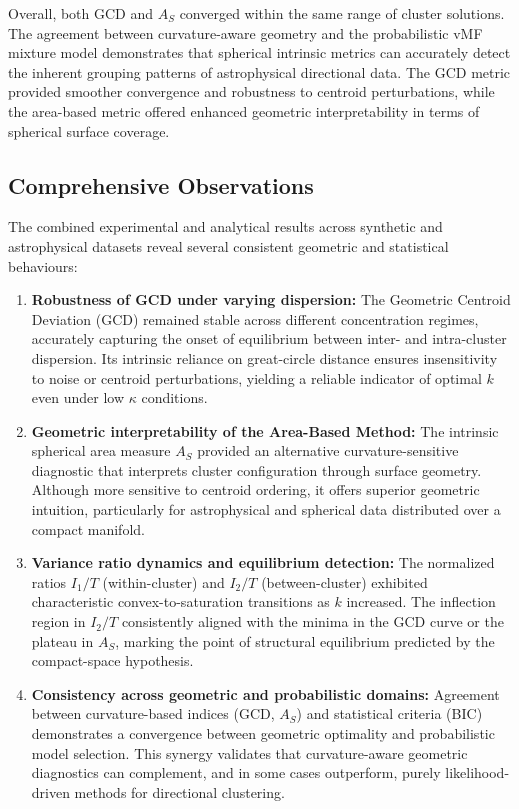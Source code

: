 \documentclass[12pt,a4paper]{report}
\begin{document}
\vspace{0.2cm}
\noindent Overall, both GCD and $A_S$ converged within the same range of cluster solutions.  
The agreement between curvature-aware geometry and the probabilistic vMF mixture model 
demonstrates that spherical intrinsic metrics can accurately detect the inherent grouping 
patterns of astrophysical directional data. The GCD metric provided smoother convergence 
and robustness to centroid perturbations, while the area-based metric offered enhanced 
geometric interpretability in terms of spherical surface coverage.


\subsection{Comprehensive Observations}
The combined experimental and analytical results across synthetic and astrophysical datasets reveal several consistent geometric and statistical behaviours:

\begin{enumerate}
    \item \textbf{Robustness of GCD under varying dispersion:}  
    The Geometric Centroid Deviation (GCD) remained stable across different concentration regimes, accurately capturing the onset of equilibrium between inter- and intra-cluster dispersion.  
    Its intrinsic reliance on great-circle distance ensures insensitivity to noise or centroid perturbations, yielding a reliable indicator of optimal $k$ even under low $\kappa$ conditions.

    \item \textbf{Geometric interpretability of the Area-Based Method:}  
    The intrinsic spherical area measure $A_S$ provided an alternative curvature-sensitive diagnostic that interprets cluster configuration through surface geometry.  
    Although more sensitive to centroid ordering, it offers superior geometric intuition, particularly for astrophysical and spherical data distributed over a compact manifold.

   \item \textbf{Variance ratio dynamics and equilibrium detection:}  
    The normalized ratios $I_1/T$ (within-cluster) and $I_2/T$ (between-cluster) exhibited characteristic convex-to-saturation transitions as $k$ increased.  
    The inflection region in $I_2/T$ consistently aligned with the minima in the GCD curve or the plateau in $A_S$, marking the point of structural equilibrium predicted by the compact-space hypothesis.


    \item \textbf{Consistency across geometric and probabilistic domains:}  
    Agreement between curvature-based indices (GCD, $A_S$) and statistical criteria (BIC) demonstrates a convergence between geometric optimality and probabilistic model selection.  
    This synergy validates that curvature-aware geometric diagnostics can complement, and in some cases outperform, purely likelihood-driven methods for directional clustering.
\end{enumerate}
\end{document}
